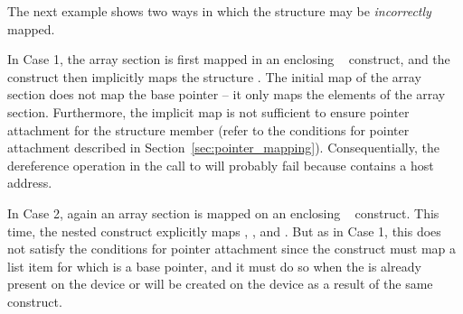 %
%


The next example shows two ways in which the structure may be
\emph{incorrectly} mapped.

In Case 1, the array section  is first mapped in an enclosing
~ construct, and the  construct then
implicitly maps the structure . The initial map of the array section
does not map the base pointer  -- it only maps the elements of the
array section.  Furthermore, the implicit map is not sufficient to ensure
pointer attachment for the structure member  (refer to the conditions
for pointer attachment described in Section~\ref{sec:pointer_mapping}).
Consequentially, the dereference operation  in the call to
 will probably fail because  contains a host address.

In Case 2, again an array section is mapped on an enclosing
~ construct. This time, the nested 
construct explicitly maps , , and . But as in
Case 1, this does not satisfy the conditions for pointer attachment since the
construct must map a list item for which  is a base pointer, and it
must do so when the  is already present on the device or will be
created on the device as a result of the same construct.


